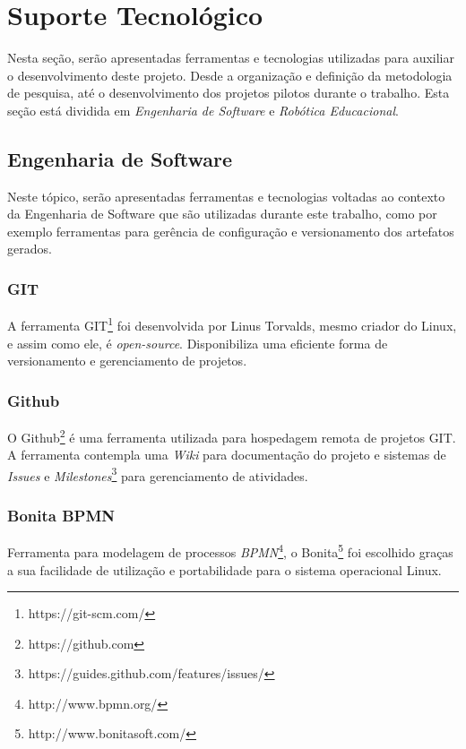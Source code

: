 
\chapter[Suporte Tecnológico]{Suporte Tecnológico}

Nesta seção, serão apresentadas ferramentas e tecnologias utilizadas para auxiliar o desenvolvimento deste projeto. Desde a organização e definição da metodologia de pesquisa, até o desenvolvimento dos projetos pilotos durante o trabalho. Esta seção está dividida em \textit{Engenharia de Software} e \textit{Robótica Educacional}.

\section{Engenharia de Software} %
\label{sec:engenharia_de_software}
	Neste tópico, serão apresentadas ferramentas e tecnologias voltadas ao contexto da Engenharia de Software que são utilizadas durante este trabalho, como por exemplo ferramentas para gerência de configuração e versionamento dos artefatos gerados.

	\subsection{GIT} %
	\label{sub:git}
	
		A ferramenta GIT\footnote{https://git-scm.com/} foi desenvolvida por Linus Torvalds, mesmo criador do Linux, e assim como ele, é \textit{open-source}. Disponibiliza uma eficiente forma de versionamento e gerenciamento de projetos. 

	\subsection{Github} %
	\label{sub:github}
		O Github\footnote{https://github.com} é uma ferramenta utilizada para hospedagem remota de projetos GIT. A ferramenta contempla uma \textit{Wiki} para documentação do projeto e sistemas de \textit{Issues} e \textit{Milestones}\footnote{https://guides.github.com/features/issues/} para gerenciamento de atividades.

	\subsection{Bonita BPMN} %
	\label{sub:bonita_bpmn}
		Ferramenta para modelagem de processos \textit{BPMN}\footnote{http://www.bpmn.org/}, o Bonita\footnote{http://www.bonitasoft.com/} foi escolhido graças a sua facilidade de utilização e portabilidade para o sistema operacional Linux.


